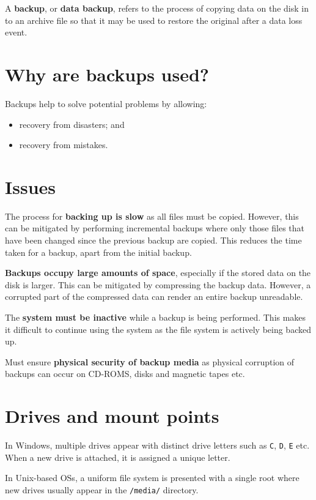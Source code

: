 \documentclass[a4paper]{systems-software}
\begin{document}
A \textbf{backup}, or \textbf{data backup}, refers to the process of  copying data on the disk in to an archive file so that it may be used to restore the original after a data loss event.


\section*{Why are backups used?}

Backups help to solve potential problems by allowing:
\begin{itemize}
	\item recovery from disasters; and
	\item recovery from mistakes.
\end{itemize}


\section*{Issues}

The process for \textbf{backing up is slow} as all files must be copied. However, this can be mitigated by performing incremental backups where only those files that have been changed since the previous backup are copied. This reduces the time taken for a backup, apart from the initial backup.

\textbf{Backups occupy large amounts of space}, especially if the stored data on the disk is larger. This can be mitigated by compressing the backup data. However, a corrupted part of the compressed data can render an entire backup unreadable.

The \textbf{system must be inactive} while a backup is being performed. This makes it difficult to continue using the system as the file system is actively being backed up.

Must ensure \textbf{physical security of backup media} as physical corruption of backups can occur on CD-ROMS, disks and magnetic tapes etc.


\section{Drives and mount points}

In Windows, multiple drives appear with distinct drive letters such as \texttt{C}, \texttt{D}, \texttt{E} etc. When a new drive is attached, it is assigned a unique letter.

In Unix-based OSs, a uniform file system is presented with a single root where new drives usually appear in the \texttt{/media/} directory.
\end{document}
